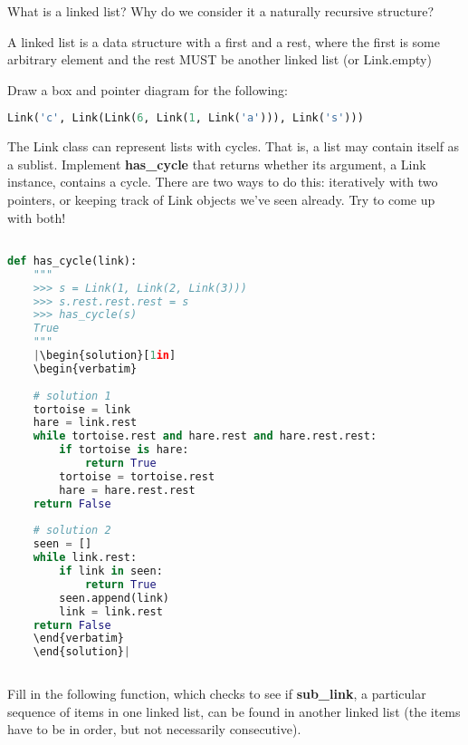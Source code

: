 \question
What is a linked list? Why do we consider it a naturally recursive structure?

\begin{solution}[0.25in]
A linked list is a data structure with a first and a rest, where the first is some arbitrary element and the rest MUST be another linked list (or Link.empty)
\end{solution}

\question
Draw a box and pointer diagram for the following:
\begin{lstlisting}[language=Python]
Link('c', Link(Link(6, Link(1, Link('a'))), Link('s')))
\end{lstlisting}
\begin{solution}[0.25in]
\end{solution}

\question
The Link class can represent lists with cycles. That is, a list may contain itself as a sublist. Implement \textbf{has\_cycle} that returns whether its argument, a Link instance, contains a cycle. There are two ways to do this: iteratively with two pointers, or keeping track of Link objects we've seen already. Try to come up with both!

\begin{lstlisting}[language=Python]

def has_cycle(link):
    """
    >>> s = Link(1, Link(2, Link(3)))
    >>> s.rest.rest.rest = s
    >>> has_cycle(s)
    True
    """
    |\begin{solution}[1in]
    \begin{verbatim}
    
    # solution 1
    tortoise = link
    hare = link.rest
    while tortoise.rest and hare.rest and hare.rest.rest:
        if tortoise is hare:
            return True
        tortoise = tortoise.rest
        hare = hare.rest.rest
    return False
    
    # solution 2
    seen = []
    while link.rest:
        if link in seen:
            return True
        seen.append(link)
        link = link.rest
    return False
    \end{verbatim}
    \end{solution}|
    
\end{lstlisting}

\question
Fill in the following function, which checks to see if \textbf{sub\_link}, a particular sequence of items in one linked list,  can be found in another linked list (the items have to be in order, but not necessarily consecutive).


